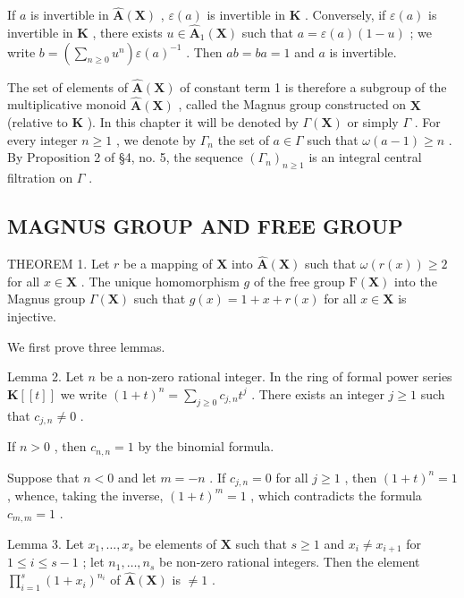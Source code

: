If \(a\) is invertible in \(\hat{\mathbf{A}}(\mathbf{X})\) , \(\varepsilon(a)\) is invertible in \(\mathbf{K}\) . Conversely, if \(\varepsilon(a)\) is invertible in \(\mathbf{K}\) , there exists \(u \in \hat{\mathbf{A}}_1(\mathbf{X})\) such that \(a = \varepsilon(a)(1 - u)\) ; we write \(b = \left(\sum_{n \geqslant 0} u^n\right)\varepsilon(a)^{-1}\) . Then \(ab = ba = 1\) and \(a\) is invertible.

The set of elements of \(\hat{\mathbf{A}}(\mathbf{X})\) of constant term 1 is therefore a subgroup of the multiplicative monoid \(\hat{\mathbf{A}}(\mathbf{X})\) , called the Magnus group constructed on \(\mathbf{X}\) (relative to \(\mathbf{K}\) ). In this chapter it will be denoted by \(\Gamma(\mathbf{X})\) or simply \(\Gamma\) . For every integer \(n \geqslant 1\) , we denote by \(\Gamma_n\) the set of \(a \in \Gamma\) such that \(\omega(a - 1) \geqslant n\) . By Proposition 2 of §4, no. 5, the sequence \((\Gamma_n)_{n \geqslant 1}\) is an integral central filtration on \(\Gamma\) .

\subsection{MAGNUS GROUP AND FREE GROUP}

THEOREM 1. Let \(r\) be a mapping of \(\mathbf{X}\) into \(\hat{\mathbf{A}}(\mathbf{X})\) such that \(\omega(r(x)) \geqslant 2\) for all \(x \in \mathbf{X}\) . The unique homomorphism \(g\) of the free group \(\mathrm{F}(\mathbf{X})\) into the Magnus group \(\Gamma(\mathbf{X})\) such that \(g(x) = 1 + x + r(x)\) for all \(x \in \mathbf{X}\) is injective.

We first prove three lemmas.

Lemma 2. Let \(n\) be a non-zero rational integer. In the ring of formal power series \(\mathbf{K}[[t]]\) we write \((1 + t)^n = \sum_{j \geqslant 0} c_{j,n} t^j\) . There exists an integer \(j \geqslant 1\) such that \(c_{j,n} \neq 0\) .

If \(n > 0\) , then \(c_{n,n} = 1\) by the binomial formula.

Suppose that \(n < 0\) and let \(m = -n\) . If \(c_{j,n} = 0\) for all \(j \geqslant 1\) , then \((1 + t)^n = 1\) , whence, taking the inverse, \((1 + t)^m = 1\) , which contradicts the formula \(c_{m,m} = 1\) .

Lemma 3. Let \(x_1, \ldots, x_s\) be elements of \(\mathbf{X}\) such that \(s \geqslant 1\) and \(x_i \neq x_{i+1}\) for \(1 \leqslant i \leqslant s-1\) ; let \(n_1, \ldots, n_s\) be non-zero rational integers. Then the element \(\prod_{i=1}^{s} (1 + x_i)^{n_i}\) of \(\hat{\mathbf{A}}(\mathbf{X})\) is \(\neq 1\) .

